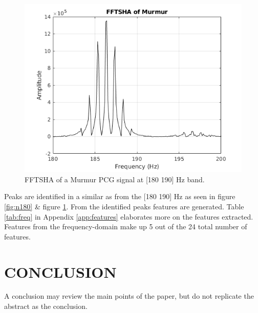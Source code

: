\documentclass[10pt,twocolumn]{witseiepaper}
\begin{document}
\begin{figure}[h!]
    \centering
    \includegraphics[scale=0.45]{./fftsha_m.png}
    \caption{FFTSHA of a Murmur PCG signal at [180 190] Hz band.}
    \label{fig:m180}
\end{figure}

Peaks are identified in a similar as \cite{love} from the [180 190] Hz as seen in figure \ref{fig:n180} \& figure \ref{fig:m180}. From the identified peaks features are generated. Table  \ref{tab:freq} in Appendix \ref{app:features} elaborates more on the features extracted. Features from the frequency-domain make up 5 out of the 24 total number of features.


\newpage
\section{CONCLUSION}

A conclusion may review the main points of the paper, but do not replicate the
abstract as the conclusion.




%




\end{document}
